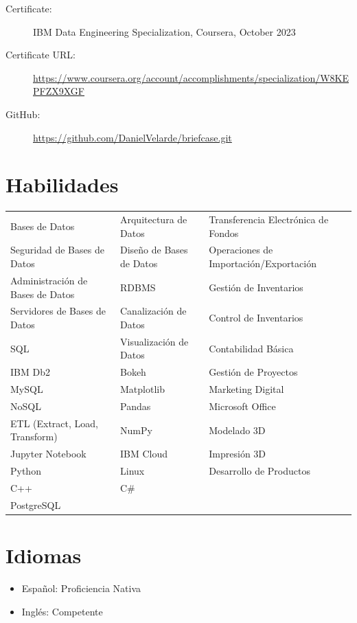 \documentclass[a4paper,10pt]{article}
\begin{document}
\begin{description}
    \item[Certificate:] IBM Data Engineering Specialization, Coursera, October 2023
    \item[Certificate URL:] \url{https://www.coursera.org/account/accomplishments/specialization/W8KEPFZX9XGF}
\end{description}
\vspace{1pt} %
\begin{description}
    \item[GitHub:] \url{https://github.com/DanielVelarde/briefcase.git}
\end{description}

\section*{Habilidades}
\begin{tabular}{p{4.5cm}p{4.5cm}p{4.5cm}}
    Bases de Datos & Arquitectura de Datos & Transferencia Electrónica de Fondos \\
    Seguridad de Bases de Datos & Diseño de Bases de Datos & Operaciones de Importación/Exportación \\
    Administración de Bases de Datos & RDBMS & Gestión de Inventarios \\
    Servidores de Bases de Datos & Canalización de Datos & Control de Inventarios \\
    SQL & Visualización de Datos & Contabilidad Básica \\
    IBM Db2 & Bokeh & Gestión de Proyectos \\
    MySQL & Matplotlib & Marketing Digital \\
    NoSQL & Pandas & Microsoft Office \\
    ETL (Extract, Load, Transform) & NumPy & Modelado 3D \\
    Jupyter Notebook & IBM Cloud & Impresión 3D \\
    Python & Linux & Desarrollo de Productos \\
    C++ & C\# & \\
    PostgreSQL & & \\
\end{tabular}

\section*{Idiomas}
\begin{itemize}
    \item Español: Proficiencia Nativa
    \item Inglés: Competente
\end{itemize}
\end{document}
